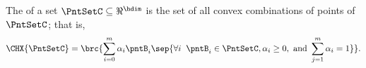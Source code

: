 \begin {defn} The  of a set $\PntSetC \subseteq \Re ^\hdim $ is the set of all convex combinations of points of $\PntSetC $; that is, \[ \CHX { \PntSetC } = \brc {\sum _{i=0}^m \alpha _i \pntB _i\sep { \forall i \;\;\pntB _i \in \PntSetC , \alpha _i \geq 0, \text { and } \sum _{j=1}^m \alpha _i =1}}. \]  \end {defn}
